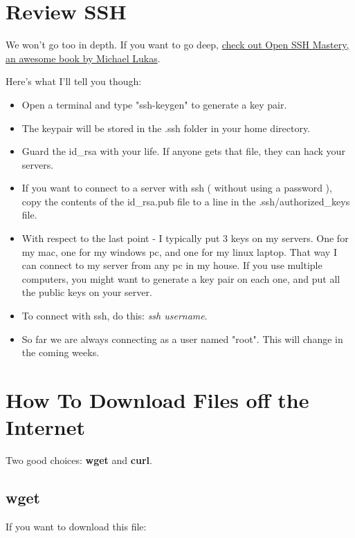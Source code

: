 \documentclass[12pt,a4paper]{article}
\begin{document}
\section{Review SSH}

We won't go too in depth. If you want to go deep, \href{
https://www.tiltedwindmillpress.com/product/ssh-mastery-2nd-edition/}{check out
Open SSH Mastery, an awesome book by Michael Lukas}.

Here's what I'll tell you though:

\begin{itemize}
\item Open a terminal and type "ssh-keygen" to generate a key pair.
\item The keypair will be stored in the .ssh folder in your home directory.
\item Guard the id\_rsa with your life. If anyone gets that file, they can hack
your servers.
\item If you want to connect to a server with ssh ( without using a password ),
copy the contents of the id\_rsa.pub file to a line in the .ssh/authorized\_keys
file.
\item With respect to the last point - I typically put 3 keys on my servers. One
for my mac, one for my windows pc, and one for my linux laptop. That way I can
connect to my server from any pc in my house. If you use multiple computers, you
might want to generate a key pair on each one, and put all  the public keys on
your server.
\item To connect with ssh, do this: \textit{ssh username\@machineIPaddress}.
\item So far we are always connecting as a user named "root". This will change
in the coming weeks.
\end{itemize}

\noindent{}


\section{How To Download Files off the Internet}

Two good choices: \textbf{wget} and \textbf{curl}.

\subsection{wget}
If you want to download this file:\newline
\end{document}
